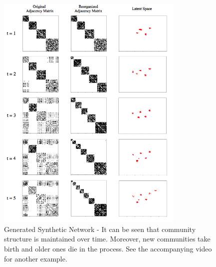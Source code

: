 \documentclass[letterpaper]{article} %
\begin{document}
\begin{figure}
\vskip 0.2in
\begin{center}
\centering
\includegraphics[width=0.8\textwidth]{generated_networks}
\caption{Generated Synthetic Network - It can be seen that community structure is maintained over time. Moreover, new communities take birth and older ones die in the process. See the accompanying video for another example.}
\label{fig:generatednetwork}
\end{center}
\vskip -0.2in
\end{figure}
\end{document}

